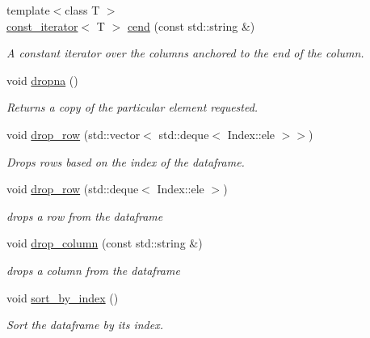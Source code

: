 \begin{DoxyCompactItemize}
{\footnotesize template$<$class T $>$ }\\\hyperlink{classDataFrame_1_1const__iterator}{const\+\_\+iterator}$<$ T $>$ \hyperlink{classDataFrame_a89d6883d335d9a92682b88a995fd3547}{cend} (const std\+::string \&)
\begin{DoxyCompactList}\small\item\em A constant iterator over the columns anchored to the end of the column. \end{DoxyCompactList}\item 
void \hyperlink{classDataFrame_a6abc672ac4c439e3e785bd3f84c8da15}{dropna} ()
\begin{DoxyCompactList}\small\item\em Returns a copy of the particular element requested. \end{DoxyCompactList}\item 
void \hyperlink{classDataFrame_a4b4198c63e6ed421968303e872beb807}{drop\+\_\+row} (std\+::vector$<$ std\+::deque$<$ Index\+::ele $>$$>$)
\begin{DoxyCompactList}\small\item\em Drops rows based on the index of the dataframe. \end{DoxyCompactList}\item 
\mbox{\label{classDataFrame_a644965d62c039b88a940c2cb83a29fbc}} 
void \hyperlink{classDataFrame_a644965d62c039b88a940c2cb83a29fbc}{drop\+\_\+row} (std\+::deque$<$ Index\+::ele $>$)
\begin{DoxyCompactList}\small\item\em drops a row from the dataframe \end{DoxyCompactList}\item 
\mbox{\label{classDataFrame_afa6fd73a62f0d45b03e5df738a575693}} 
void \hyperlink{classDataFrame_afa6fd73a62f0d45b03e5df738a575693}{drop\+\_\+column} (const std\+::string \&)
\begin{DoxyCompactList}\small\item\em drops a column from the dataframe \end{DoxyCompactList}\item 
\mbox{\label{classDataFrame_ae9eb64b2d0c072459f85a4b840978060}} 
void \hyperlink{classDataFrame_ae9eb64b2d0c072459f85a4b840978060}{sort\+\_\+by\+\_\+index} ()
\begin{DoxyCompactList}\small\item\em Sort the dataframe by its index. \end{DoxyCompactList}\item 
$$
\end{DoxyCompactItemize}
